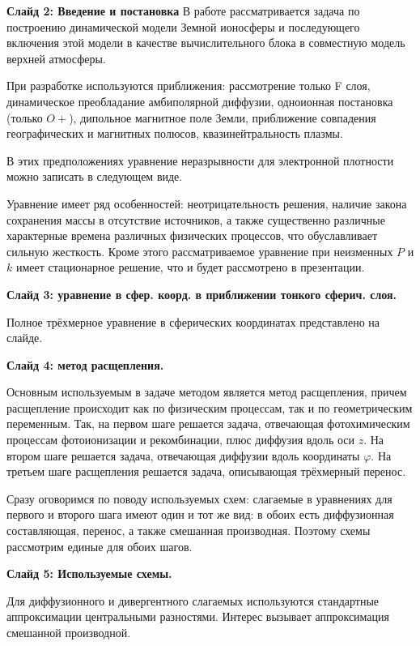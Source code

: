 \documentclass[2pt, a4paper, fleqn]{extarticle}
\begin{document}
{\bf Слайд 2: Введение и постановка}
В работе рассматривается задача по построению динамической модели Земной ионосферы и последующего включения этой модели в качестве вычислительного блока в совместную модель верхней атмосферы. 

При разработке используются приближения: рассмотрение только F слоя, динамическое преобладание амбиполярной диффузии, одноионная постановка (только $O+$), дипольное магнитное поле Земли, приближение совпадения географических и магнитных полюсов, квазинейтральность плазмы.

В этих предположениях уравнение неразрывности для электронной плотности можно записать в следующем виде.

Уравнение имеет ряд особенностей: неотрицательность решения, наличие закона сохранения массы в отсутствие источников, а также существенно различные характерные времена различных физических процессов, что обуславливает сильную жесткость.
Кроме этого рассматриваемое уравнение при неизменных $P$ и $k$ имеет стационарное решение, что и будет рассмотрено в презентации.

\medskip

{\bf Слайд 3: уравнение в сфер. коорд. в приближении тонкого сферич. слоя.}

Полное трёхмерное уравнение в сферических координатах представлено на слайде.

\medskip

{\bf Слайд 4: метод расщепления.}

Основным используемым в задаче методом является метод расщепления, причем расщепление происходит как по физическим процессам, так и по геометрическим переменным. Так, на первом шаге решается задача, отвечающая фотохимическим процессам фотоионизации и рекомбинации, плюс диффузия вдоль оси $z$. На втором шаге решается задача, отвечающая диффузии вдоль координаты $\varphi$. На третьем шаге расщепления решается задача, описывающая трёхмерный перенос.

Сразу оговоримся по поводу используемых схем: слагаемые в уравнениях для первого и второго шага имеют один и тот же вид: в обоих есть диффузионная составляющая, перенос, а также смешанная производная. Поэтому схемы рассмотрим единые для обоих шагов.

\medskip

{\bf Слайд 5: Используемые схемы.}

Для диффузионного и дивергентного слагаемых используются стандартные аппроксимации центральными разностями. Интерес вызывает аппроксимация смешанной производной.
\end{document}
